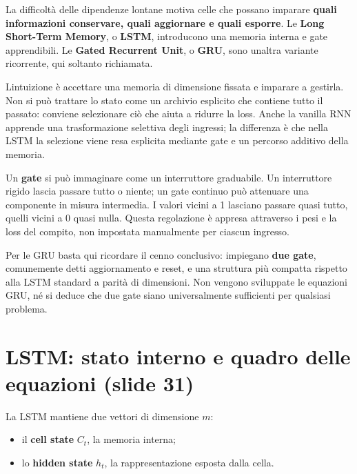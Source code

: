 \documentclass[11pt,a4paper,oneside,openany]{book}
\providecommand{\tightlist}{\setlength{\itemsep}{0pt}\setlength{\parskip}{0pt}}
\begin{document}
La difficoltà delle dipendenze lontane motiva celle che possano imparare \textbf{quali informazioni conservare, quali aggiornare e quali esporre}. Le \textbf{Long Short-Term Memory}, o \textbf{LSTM}, introducono una memoria interna e gate apprendibili. Le \textbf{Gated Recurrent Unit}, o \textbf{GRU}, sono un\textquotesingle altra variante ricorrente, qui soltanto richiamata.

L\textquotesingle intuizione è accettare una memoria di dimensione fissata e imparare a gestirla. Non si può trattare lo stato come un archivio esplicito che contiene tutto il passato: conviene selezionare ciò che aiuta a ridurre la loss. Anche la vanilla RNN apprende una trasformazione selettiva degli ingressi; la differenza è che nella LSTM la selezione viene resa esplicita mediante gate e un percorso additivo della memoria.

Un \textbf{gate} si può immaginare come un interruttore graduabile. Un interruttore rigido lascia passare tutto o niente; un gate continuo può attenuare una componente in misura intermedia. I valori vicini a 1 lasciano passare quasi tutto, quelli vicini a 0 quasi nulla. Questa regolazione è appresa attraverso i pesi e la loss del compito, non impostata manualmente per ciascun ingresso.

Per le GRU basta qui ricordare il cenno conclusivo: impiegano \textbf{due gate}, comunemente detti aggiornamento e reset, e una struttura più compatta rispetto alla LSTM standard a parità di dimensioni. Non vengono sviluppate le equazioni GRU, né si deduce che due gate siano universalmente sufficienti per qualsiasi problema.

\section{LSTM: stato interno e quadro delle equazioni (slide 31)}\label{f03-r648}

La LSTM mantiene due vettori di dimensione \(m\):

\begin{itemize}
\tightlist
\item
  il \textbf{cell state} \(C_t\), la memoria interna;
\item
  lo \textbf{hidden state} \(h_t\), la rappresentazione esposta dalla cella.
\end{itemize}
\end{document}
